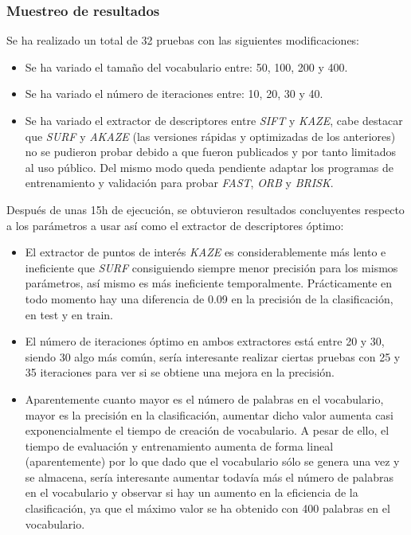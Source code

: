 \documentclass[a4paper,12pt]{article}
\begin{document}
{\vspace{0.5cm}

\subsubsection{Muestreo de resultados}

Se ha realizado un total de 32 pruebas con las siguientes modificaciones:

\vspace{0.5cm}

\begin{itemize}
    \item Se ha variado el tamaño del vocabulario entre: 50, 100, 200 y 400.
    \item Se ha variado el número de iteraciones entre: 10, 20, 30 y 40.
    \item Se ha variado el extractor de descriptores entre \textit{SIFT} y \textit{KAZE}, cabe destacar que \textit{SURF} y \textit{AKAZE} (las versiones rápidas y optimizadas de los anteriores) no se pudieron probar debido a que fueron publicados y por tanto limitados al uso público. Del mismo modo queda pendiente adaptar los programas de entrenamiento y validación para probar \textit{FAST}, \textit{ORB} y \textit{BRISK}.
\end{itemize}

\vspace{0.5cm}

Después de unas 15h de ejecución, se obtuvieron resultados concluyentes respecto a los parámetros a usar así como el extractor de descriptores óptimo:

\vspace{0.5cm}

\begin{itemize}
    \item El extractor de puntos de interés \textit{KAZE} es considerablemente más lento e ineficiente que \textit{SURF} consiguiendo siempre menor precisión para los mismos parámetros, así mismo es más ineficiente temporalmente. Prácticamente en todo momento hay una diferencia de 0.09 en la precisión de la clasificación, en test y en train.
    \item El número de iteraciones óptimo en ambos extractores está entre 20 y 30, siendo 30 algo más común, sería interesante realizar ciertas pruebas con 25 y 35 iteraciones para ver si se obtiene una mejora en la precisión.
    \item Aparentemente cuanto mayor es el número de palabras en el vocabulario, mayor es la precisión en la clasificación, aumentar dicho valor aumenta casi exponencialmente el tiempo de creación de vocabulario. A pesar de ello, el tiempo de evaluación y entrenamiento aumenta de forma lineal (aparentemente) por lo que dado que el vocabulario sólo se genera una vez y se almacena, sería interesante aumentar todavía más el número de palabras en el vocabulario y observar si hay un aumento en la eficiencia de la clasificación, ya que el máximo valor se ha obtenido con 400 palabras en el vocabulario.
\end{itemize}

}
\end{document}

